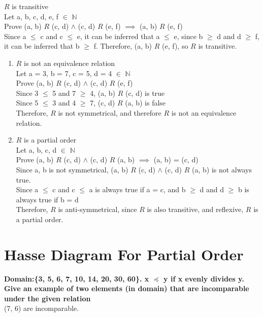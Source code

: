 \documentclass[a4paper]{article}
\begin{document}
\begin{enumerate}
    $R$ is transitive \\
    Let a, b, c, d, e, f $\in$ $\mathbb{N}$ \\
    Prove (a, b) $R$ (c, d) $\land$ (c, d) $R$ (e, f) $\implies$ (a, b) $R$ (e, f)\\
    Since a $\le$ c and c $\le$ e, it can be inferred that a $\le$ e, since b $\ge$ d and d $\ge$ f, it can be inferred that b $\ge$ f.
    Therefore, (a, b) $R$ (e, f), so $R$ is transitive.
    \begin{enumerate}
        \item $R$ is not an equivalence relation \\
        Let a = 3, b = 7, c = 5, d = 4 $\in$ $\mathbb{N}$ \\
        Prove (a, b) $R$ (c, d) $\land$ (c, d) $R$ (e, f) \\
        Since 3 $\le$ 5 and 7 $\ge$ 4, (a, b) $R$ (c, d) is true \\
        Since 5 $\le$ 3 and 4 $\ge$ 7, (c, d) $R$ (a, b) is false \\
        Therefore, $R$ is not symmetrical, and therefore $R$ is not an equivalence relation.
        \item $R$ is a partial order \\
        Let a, b, c, d $\in$ $\mathbb{N}$ \\
        Prove (a, b) $R$ (c, d) $\land$ (c, d) $R$ (a, b) $\implies$ (a, b) = (c, d) \\
        Since a, b is not symmetrical, (a, b) $R$ (c, d) $\land$ (c, d) $R$ (a, b) is not always true. \\
        Since a $\le$ c and c $\le$ a is always true if a = c, and b $\ge$ d and d $\ge$ b is always true if b = d \\
        Therefore, $R$ is anti-symmetrical, since $R$ is also transitive, and reflexive, $R$ is a partial order.
    \end{enumerate}
\end{enumerate}

\bigskip %

\section{Hasse Diagram For Partial Order}
\textbf{Domain:\{3, 5, 6, 7, 10, 14, 20, 30, 60\}. x $\preceq$ y if x evenly divides y.} \\
\textbf{Give an example of two elements (in domain) that are incomparable under the given relation} \\
(7, 6) are incomparable.
\end{document}
